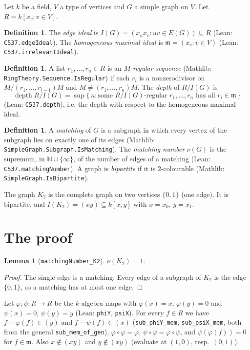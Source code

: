 \documentclass[11pt]{article}
\newtheorem{lemma}[theorem]{Lemma}
\theoremstyle{definition}
\newtheorem{definition}[theorem]{Definition}
\begin{document}
Let $k$ be a field, $V$ a type of vertices and $G$ a simple graph on $V$. Let $R = k[x_v : v\in V]$.
\begin{definition}
The \emph{edge ideal} is $I(G) = (x_u x_v : uv \in E(G)) \subseteq R$ (Lean: \texttt{C537.edgeIdeal}).
The \emph{homogeneous maximal ideal} is $\mathfrak m = (x_v : v \in V)$ (Lean: \texttt{C537.irrelevantIdeal}).
\end{definition}
\begin{definition}
A list $r_1,\dots,r_n \in R$ is an \emph{$M$-regular sequence} (Mathlib: \texttt{RingTheory.Sequence.IsRegular})
if each $r_i$ is a nonzerodivisor on $M/(r_1,\dots,r_{i-1})M$ and $M \ne (r_1,\dots,r_n)M$.
The \emph{depth} of $R/I(G)$ is
\[
\operatorname{depth} R/I(G) = \sup\{\, n : \text{some } R/I(G)\text{-regular } r_1,\dots,r_n
\text{ has all } r_i \in \mathfrak m \,\}
\]
(Lean: \texttt{C537.depth}), i.e. the depth with respect to the homogeneous maximal ideal.
\end{definition}
\begin{definition}
A \emph{matching} of $G$ is a subgraph in which every vertex of the subgraph lies on exactly one of its edges
(Mathlib: \texttt{SimpleGraph.Subgraph.IsMatching}). The \emph{matching number} $\nu(G)$ is the supremum, in
$\mathbb N\cup\{\infty\}$, of the number of edges of a matching (Lean: \texttt{C537.matchingNumber}).
A graph is \emph{bipartite} if it is $2$-colourable (Mathlib: \texttt{SimpleGraph.IsBipartite}).
\end{definition}

The graph $K_2$ is the complete graph on two vertices $\{0,1\}$ (one edge). It is bipartite, and
$I(K_2) = (xy) \subseteq k[x,y]$ with $x = x_0$, $y = x_1$.

\section{The proof}

\begin{lemma}[\texttt{matchingNumber\_K2}]
$\nu(K_2) = 1$.
\end{lemma}
\begin{proof}
The single edge is a matching. Every edge of a subgraph of $K_2$ is the edge $\{0,1\}$, so a matching has at most
one edge.
\end{proof}

Let $\varphi, \psi : R \to R$ be the $k$-algebra maps with $\varphi(x)=x$, $\varphi(y)=0$ and $\psi(x)=0$,
$\psi(y)=y$ (Lean: \texttt{phiY}, \texttt{psiX}). For every $f\in R$ we have $f-\varphi(f) \in (y)$ and
$f - \psi(f) \in (x)$ (\texttt{sub\_phiY\_mem}, \texttt{sub\_psiX\_mem}, both from the general \texttt{sub\_mem\_of\_gen}),
$\varphi\circ\varphi = \varphi$, $\psi\circ\varphi=\varphi\circ\psi$, and $\psi(\varphi(f)) = 0$ for $f\in\mathfrak m$.
Also $x \notin (xy)$ and $y\notin(xy)$ (evaluate at $(1,0)$, resp.\ $(0,1)$).
\end{document}

